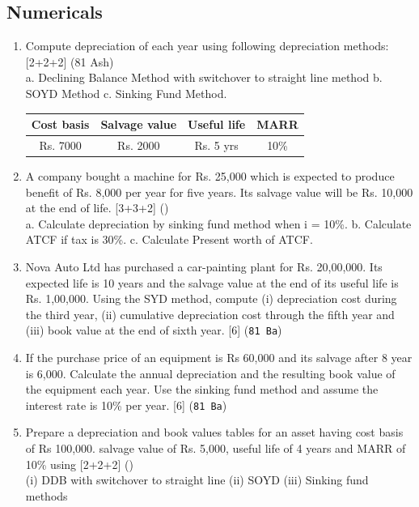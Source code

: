 \documentclass[12pt]{article}
\begin{document}
	\subsection{Numericals}
		\begin{enumerate}
			\item Compute depreciation of each year using following depreciation methods: \hfill [2+2+2] (81 Ash)\\
			a. Declining Balance Method with switchover to straight line method
			b. SOYD Method
			c. Sinking Fund Method.\\
			\begin{tabular}{|c|c|c|c|}
				\hline
				Cost basis & Salvage value & Useful life & MARR \\ \hline
				Rs. 7000 & Rs. 2000 & Rs. 5 yrs & 10\% \\ \hline
			\end{tabular}

			\item A company bought a machine for Rs. 25,000 which is expected to produce benefit of Rs. 8,000 per year for five years. Its salvage value will be Rs. 10,000 at the end of life. \hfill [3+3+2] ()\\
			a. Calculate depreciation by sinking fund method when i = 10\%.
			b. Calculate ATCF if tax is 30\%.
			c. Calculate Present worth of ATCF.

			\item Nova Auto Ltd has purchased a car-painting plant for Rs. 20,00,000. Its expected life is 10 years and the salvage value at the end of its useful life is Rs. 1,00,000. Using the SYD method, compute (i) depreciation cost during the third year, (ii) cumulative depreciation cost through the fifth year and (iii) book value at the end of sixth year. \hfill [6] (\texttt{81 Ba})

			\item If the purchase price of an equipment is Rs 60,000 and its salvage after 8 year is 6,000. Calculate the annual depreciation and the resulting book value of the equipment each year. Use the sinking fund method and assume the interest rate is 10\% per year. \hfill [6] (\texttt{81 Ba})

			\item Prepare a depreciation and book values tables for an asset having cost basis of Rs 100,000. salvage value of Rs. 5,000, useful life of 4 years and MARR of 10\% using \hfill [2+2+2] ()\\
			(i) DDB with switchover to straight line (ii) SOYD (iii) Sinking fund methods


\end{enumerate}
\end{document}
